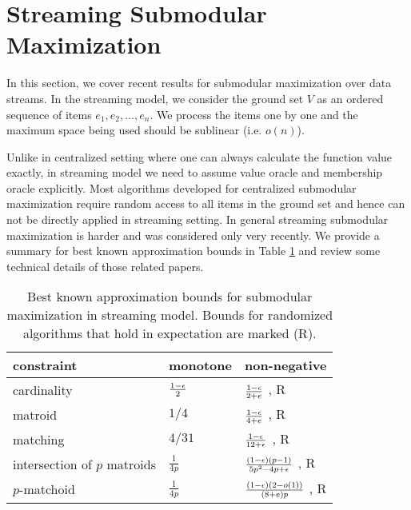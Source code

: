 \section{Streaming Submodular Maximization}
\label{sec:streaming}
In this section, we cover recent results for submodular maximization over data streams. In the streaming model, we consider the ground set $V$ as an ordered sequence of items $e_1, e_2, \ldots, e_n$. We process the items one by one and the maximum space being used should be sublinear (i.e. $o(n)$).


Unlike in centralized setting where one can always calculate the function value exactly, in streaming model we need to assume value oracle and membership oracle explicitly.  Most algorithms developed for centralized submodular maximization require random access to all items in the ground set and hence can not be directly applied in streaming setting. In general streaming submodular maximization is harder and was considered only very recently. We provide a summary for best known approximation bounds in Table \ref{table:streaming} and review some technical details of those related papers.

\begin{table}[t]
\centering
\begin{tabular}{|l|l|l|}
\hline
constraint & monotone  &  non-negative \\
\hline
cardinality & $\frac{1-\epsilon}{2}$ \cite{BMK+14} & $\frac{1 - \epsilon}{2 + e}$ \cite{CGQ15}, R\\
\hline
matroid & $1/4$ \cite{CK14} & $\frac{1 - \epsilon}{4 + e}$ \cite{CGQ15},  R \\
\hline
matching & $4/31$ \cite{CK14} & $\frac{1 - \epsilon}{12 + \epsilon}$ \cite{CGQ15}, R \\
\hline
intersection of $p$ matroids & $\frac{1}{4p}$ \cite{CK14} & $\frac{(1 - \epsilon)(p - 1)}{5p^2 -4p + \epsilon}$ \cite{CGQ15}, R\\
\hline
$p$-matchoid & $\frac{1}{4p}$ \cite{CGQ15} & $\frac{(1-\epsilon)(2-o(1))}{(8+e)p}$ \cite{CGQ15}, R\\
\hline
\end{tabular}
\caption{Best known approximation bounds for submodular maximization in streaming model. Bounds for randomized algorithms that hold in expectation are marked (R).}
\label{table:streaming}
\end{table}







